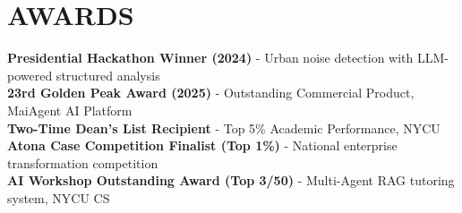 \documentclass[letterpaper,11pt]{article}
\makeatletter
\newcommand{\resumeItem}[1]{
  \item\small{#1}
}
\newcommand{\resumeSubheading}[4]{
  \vspace{-1.5pt}\item
    \begin{tabular*}{1.0\textwidth}[t]{l@{\extracolsep{\fill}}r}
      \textbf{#1} \vspace{-1.5pt}& \textbf{\small #2} \\
      \textit{\small#3} & \textit{\small #4} \\
    \end{tabular*}
}
\newcommand{\resumeSubHeadingListStart}{\begin{itemize}[leftmargin=0.0in, label={}]}
\newcommand{\resumeSubHeadingListEnd}{\end{itemize}}
\newcommand{\resumeItemListStart}{\begin{itemize}[label=$\vcenter{\hbox{\tiny$\bullet$}}$]}
\newcommand{\resumeItemListEnd}{\end{itemize}}
\makeatother
\begin{document}

\section{AWARDS}
\noindent\small 
\textbf{Presidential Hackathon Winner (2024)} - Urban noise detection with LLM-powered structured analysis
\\ \textbf{23rd Golden Peak Award (2025)} - Outstanding Commercial Product, MaiAgent AI Platform
\\ \textbf{Two-Time Dean's List Recipient} - Top 5\% Academic Performance, NYCU
\\ \textbf{Atona Case Competition Finalist (Top 1\%)} - National enterprise transformation competition
\\ \textbf{AI Workshop Outstanding Award (Top 3/50)} - Multi-Agent RAG tutoring system, NYCU CS
\end{document}
